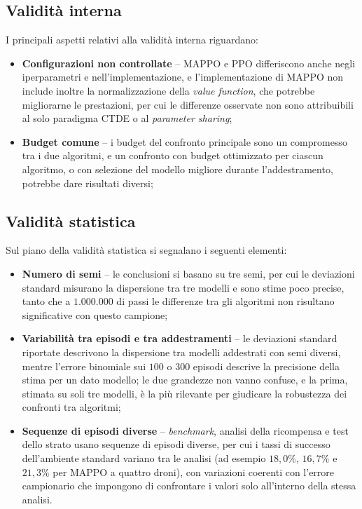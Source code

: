 \documentclass[12pt,a4paper,twoside]{report}
\begin{document}
\subsection{Validità interna}
I principali aspetti relativi alla validità interna riguardano:
\begin{itemize}
    \item \textbf{Configurazioni non controllate} -- MAPPO e PPO differiscono anche negli iperparametri e nell'implementazione, e l'implementazione di MAPPO non include inoltre la normalizzazione della \emph{value function}, che potrebbe migliorarne le prestazioni, per cui le differenze osservate non sono attribuibili al solo paradigma CTDE o al \emph{parameter sharing};
    \item \textbf{Budget comune} -- i budget del confronto principale sono un compromesso tra i due algoritmi, e un confronto con budget ottimizzato per ciascun algoritmo, o con selezione del modello migliore durante l'addestramento, potrebbe dare risultati diversi;
\end{itemize}

\subsection{Validità statistica}
Sul piano della validità statistica si segnalano i seguenti elementi:
\begin{itemize}
    \item \textbf{Numero di semi} -- le conclusioni si basano su tre semi, per cui le deviazioni standard misurano la dispersione tra tre modelli e sono stime poco precise, tanto che a $1.000.000$ di passi le differenze tra gli algoritmi non risultano significative con questo campione;
    \item \textbf{Variabilità tra episodi e tra addestramenti} -- le deviazioni standard riportate descrivono la dispersione tra modelli addestrati con semi diversi, mentre l'errore binomiale sui $100$ o $300$ episodi descrive la precisione della stima per un dato modello; le due grandezze non vanno confuse, e la prima, stimata su soli tre modelli, è la più rilevante per giudicare la robustezza dei confronti tra algoritmi;
    \item \textbf{Sequenze di episodi diverse} -- \emph{benchmark}, analisi della ricompensa e test dello strato usano sequenze di episodi diverse, per cui i tassi di successo dell'ambiente standard variano tra le analisi (ad esempio $18,0\%$, $16,7\%$ e $21,3\%$ per MAPPO a quattro droni), con variazioni coerenti con l'errore campionario che impongono di confrontare i valori solo all'interno della stessa analisi.
\end{itemize}
\end{document}
